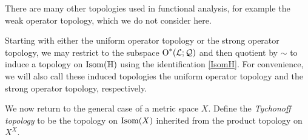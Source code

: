 \begin{remark}
There are many other topologies used in functional analysis, for example the weak operator topology, which we do not consider here.
\end{remark}

Starting with either the uniform operator topology or the strong operator topology, we may restrict to the subspace $\operatorname{O}^*(\mathcal L;\mathcal Q)$ and then quotient by $\sim$ to induce a topology on $\Isom(\H)$ using the identification \eqref{IsomH}. For convenience, we will also call these induced topologies the uniform operator topology and the strong operator topology, respectively.

We now return to the general case of a metric space $X$. Define the \emph{Tychonoff topology} to be the topology on $\operatorname{Isom}(X)$ inherited from the product topology on $X^X$.


